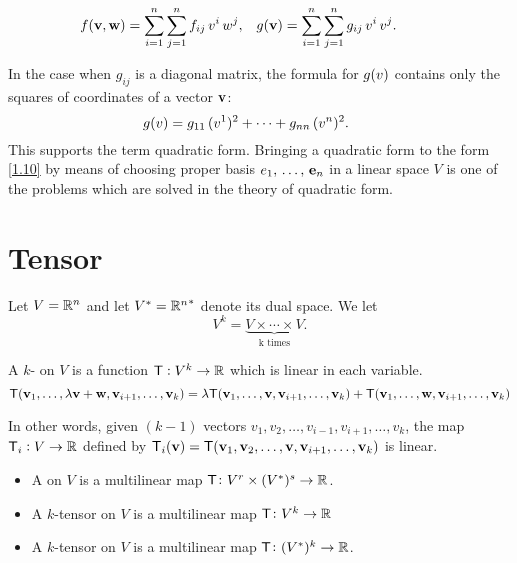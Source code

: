 \begin{alignat}{2}
&\hskip -2em
f(\vector{v},\vector{w})=\dsum^n_{i=1}\dsum^n_{j=1} f_{ij}\,v^i\,w^j,
&&g(\vector{v})=\dsum^n_{i=1}\dsum^n_{j=1} g_{ij}\,v^i\,v^j.
\label{1.9}
\end{alignat}

In the case when $g_{ij}$ is a diagonal matrix, the formula for $g(\bold \vector{v})$
contains only the squares of coordinates of a vector $\mathbf{ v}$:
\begin{equation}
\hskip -2em
g(\bold \vector{v})=g_{11}\,(v^1)^2+\dots+g_{nn}\,(v^n)^2.
\label{1.10}
\end{equation}
This supports the term quadratic form.
Bringing a quadratic form to the form \ref{1.10} by means of choosing
proper basis $\bold \vector{e}_1,\,\dots,\,\bold e_n$ in a linear space $V$ is one
of the problems which are solved in the theory of quadratic form.\par

\section{Tensor } 




Let $V=\mathbb{R}^n$ and let $V^*={\mathbb{R}^n}^*$ denote its dual space.  We let 
\[V^k = \underbrace{V \times \cdots \times V}_{\text{ k times }}.\]

\begin{definition}
  A $k$-  on $V$ is a function $\mathsf{T}: V^k \to \mathbb{R}$ which is linear in each  variable.  
  \[ \mathsf{T}(\mathbf{ v}_1, \ldots ,\lambda \mathbf{ v}+\mathbf{ w},\mathbf{ v}_{i+1}, \ldots ,\mathbf{ v}_k)=\lambda \mathsf{T}(\mathbf{ v}_1, \ldots ,\mathbf{ v},\mathbf{ v}_{i+1}, \ldots ,\mathbf{ v}_k)+\mathsf{T}(\mathbf{ v}_1, \ldots ,\mathbf{ w},\mathbf{ v}_{i+1}, \ldots ,\mathbf{ v}_k)\]
\end{definition}

 In other words, given $(k-1)$ vectors
  $v_1,v_2, \ldots ,v_{i-1},v_{i+1}, \ldots ,v_k$, the map $\mathsf{T}_i: V \to \mathbb{R}$ defined by $\mathsf{T}_i(\mathbf{ v}) = \mathsf{T}(\mathbf{ v}_1,\mathbf{ v}_2, \ldots ,\mathbf{ v},\mathbf{ v}_{i+1}, \ldots ,\mathbf{ v}_k)$ is linear.
  
\begin{df} \mbox{}
 

\begin{itemize} 
\item A   on $V$ is a multilinear map $\mathsf{T}\colon V^r \times (V^*)^s \to \mathbb{R}$.
\item  A   $k$-tensor on $V$ is a multilinear map $\mathsf{T}\colon V^k \to \mathbb{R}$
\item  A   $k$-tensor on $V$ is a multilinear map $\mathsf{T}\colon (V^*)^k\to \mathbb{R}$.

\end{itemize}
\end{df}




